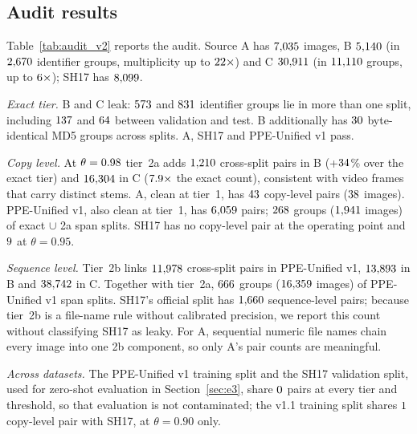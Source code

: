 \documentclass[review,12pt]{elsarticle}
\newcommand{\inputfloat}[2]{{\renewenvironment{table*}[1][]
  {\begin{table}[#1]}{\end{table}}#2}}
\begin{document}


\subsection{Audit results}
\label{sec:audit-results}
Table~\ref{tab:audit_v2} reports the audit. Source A has
$7{,}035$ images, B $5{,}140$ (in $2{,}670$ identifier groups,
multiplicity up to $22\times$) and C $30{,}911$ (in $11{,}110$
groups, up to $6\times$); SH17 has $8{,}099$.

\emph{Exact tier.} B and C leak: $573$ and $831$ identifier
groups lie in more than one split, including $137$ and $64$
between validation and test. B additionally has $30$
byte-identical MD5 groups across splits. A, SH17 and PPE-Unified v1
pass.

\emph{Copy level.} At $\theta=0.98$ tier~2a adds $1{,}210$
cross-split pairs in B (+$34$\% over the exact tier) and
$16{,}304$ in C ($7.9\times$ the exact count), consistent with video
frames that carry distinct stems. A, clean at tier~1, has
$43$ copy-level pairs ($38$ images). PPE-Unified v1,
also clean at tier~1, has $6{,}059$ pairs; $268$ groups
($1{,}941$ images) of exact $\cup$ 2a span splits. SH17 has no
copy-level pair at the operating point and $9$ at
$\theta=0.95$.

\emph{Sequence level.} Tier~2b links $11{,}978$ cross-split pairs in
PPE-Unified v1, $13{,}893$ in B and $38{,}742$ in C. Together with
tier~2a, $666$ groups ($16{,}359$ images) of PPE-Unified v1
span splits. SH17's official split has $1{,}660$ sequence-level
pairs; because tier~2b is a file-name rule without calibrated
precision, we report this count without classifying SH17 as leaky. For
A, sequential numeric file names chain every image into one 2b
component, so only A's pair counts are meaningful.

\emph{Across datasets.} The PPE-Unified v1 training split and the SH17
validation split, used for zero-shot evaluation in
Section~\ref{sec:e3}, share $0$ pairs at every tier and
threshold, so that evaluation is not contaminated; the v1.1 training
split shares $1$ copy-level pair with SH17, at
$\theta=0.90$ only.

\inputfloat{p}{\renewcommand{\arraystretch}{0.92}}
\end{document}
